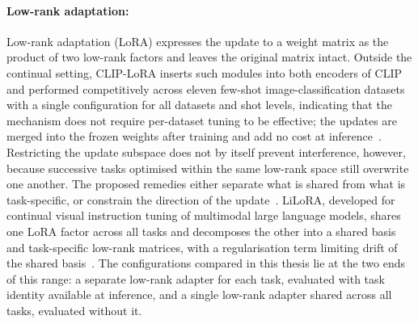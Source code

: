 \paragraph{Low-rank adaptation:} Low-rank adaptation (LoRA) expresses the update to a weight matrix as the product of two low-rank factors and leaves the original matrix intact. Outside the continual setting, CLIP-LoRA inserts such modules into both encoders of CLIP and performed competitively across eleven few-shot image-classification datasets with a single configuration for all datasets and shot levels, indicating that the mechanism does not require per-dataset tuning to be effective; the updates are merged into the frozen weights after training and add no cost at inference~\cite{zanella2024lowrankfewshotadaptationvisionlanguage}. Restricting the update subspace does not by itself prevent interference, however, because successive tasks optimised within the same low-rank space still overwrite one another. The proposed remedies either separate what is shared from what is task-specific, or constrain the direction of the update~\cite{wang2023orthogonalsubspacelearninglanguage}. LiLoRA, developed for continual visual instruction tuning of multimodal large language models, shares one LoRA factor across all tasks and decomposes the other into a shared basis and task-specific low-rank matrices, with a regularisation term limiting drift of the shared basis~\cite{che2026loraloraparameterefficientarchitecture}. The configurations compared in this thesis lie at the two ends of this range: a separate low-rank adapter for each task, evaluated with task identity available at inference, and a single low-rank adapter shared across all tasks, evaluated without it.

